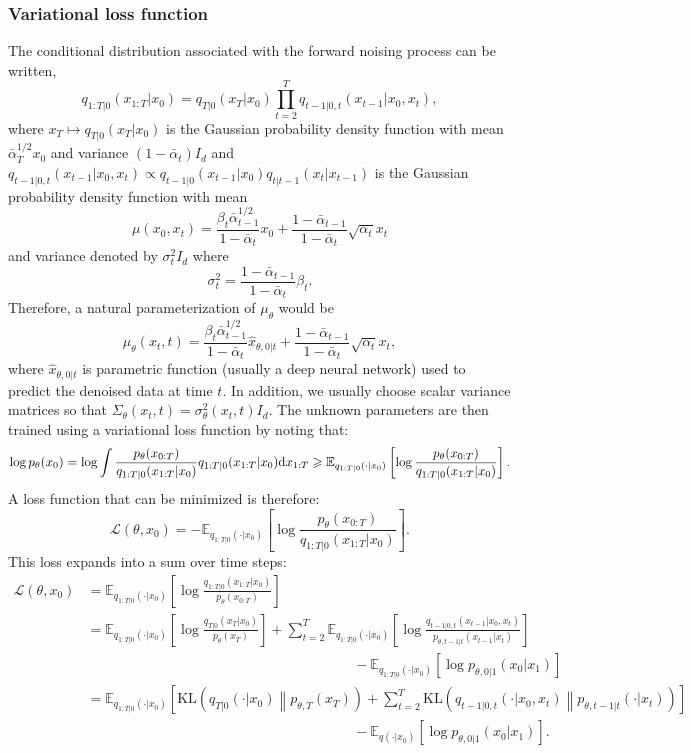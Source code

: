 \documentclass[english,graybox,envcountchap,envcountsame,sectrefs,shortlabels]{svmono}
\theoremstyle{style}
\newcommand{\eqsp}{}
\begin{document}
\subsubsection*{Variational loss function}
The conditional distribution associated with the forward noising process can be written, 
$$
q_{1:T|0}(x_{1:T}|x_0) = q_{T|0}(x_T|x_0)\prod_{t=2}^Tq_{t-1|0,t}(x_{t-1}|x_0,x_t)\eqsp,
$$
where $x_T\mapsto q_{T|0}(x_T|x_0)$ is the Gaussian probability density function with mean $\bar {\alpha}_T^{1/2}x_0$ and variance $(1-\bar \alpha_t)I_d$ and 
$q_{t-1|0,t}(x_{t-1}|x_0,x_t) \propto q_{t-1|0}(x_{t-1}|x_0) q_{t|t-1}(x_{t}|x_{t-1})$ is the Gaussian probability density function with mean
$$
\mu(x_0,x_t) = \frac{\beta_t\bar{\alpha}_{t-1}^{1/2}}{1-\bar{\alpha}_t}x_0 + \frac{1 - \bar{\alpha}_{t-1}}{1 - \bar{\alpha}_t}\sqrt{\alpha_t}x_t
$$ 
and variance denoted by $\sigma^2_{t}I_d$ where
$$ 
\sigma^2_{t} = \frac{1-\bar{\alpha}_{t-1}}{1-\bar{\alpha}_t} \beta_t\eqsp.
$$
Therefore, a natural parameterization of $\mu_\theta$ would be
$$
\mu_\theta(x_{t}, t) = \frac{\beta_t\bar{\alpha}_{t-1}^{1/2}}{1-\bar{\alpha}_t}\widehat{x}_{\theta,0|t} + \frac{1 - \bar{\alpha}_{t-1}}{1 - \bar{\alpha}_t}\sqrt{\alpha_t}x_t\eqsp,
$$
where $\widehat{x}_{\theta,0|t}$ is parametric function (usually a deep neural network) used to predict the denoised data at time $t$. In addition, we usually choose scalar variance matrices so that $\Sigma_\theta(x_{t}, t) = \sigma^2_{\theta}(x_t,t)I_d$.  
The unknown parameters are then trained using a variational loss function by noting that:
$$
\log p_\theta(x_0) = \log \int \frac{p_\theta(x_{0:T})}{q_{1:T|0}(x_{1:T}|x_0)} q_{1:T|0}(x_{1:T}|x_0)\rmd x_{1:T} \geqslant \mathbb{E}_{q_{1:T|0}(\cdot|x_0)}\left[\log\frac{p_\theta(x_{0:T})}{q_{1:T|0}(x_{1:T}|x_0)}\right]\eqsp.
$$
A loss function that can be minimized is therefore:
$$
\mathcal{L}(\theta,x_0) = -\mathbb{E}_{q_{1:T|0}(\cdot|x_0)}\left[\log\frac{p_\theta(x_{0:T})}{q_{1:T|0}(x_{1:T}|x_0)}\right]\eqsp.
$$
This loss expands into a sum over time steps:
\begin{align*}
\mathcal{L}(\theta,x_0) &= \mathbb{E}_{q_{1:T|0}(\cdot|x_0)}\left[\log\frac{q_{1:T|0}(x_{1:T}|x_0)}{p_\theta(x_{0:T})}\right] \\
&= \mathbb{E}_{q_{1:T|0}(\cdot|x_0)}\left[\log\frac{q_{T|0}(x_{T}|x_0)}{p_\theta(x_{T})}\right] + \sum_{t=2}^T\mathbb{E}_{q_{1:T|0}(\cdot|x_0)}\left[\log\frac{q_{t-1|0,t}(x_{t-1}|x_0,x_t)}{p_{\theta,t-1|t}(x_{t-1}|x_t)}\right] \\
&\hspace{8cm} - \mathbb{E}_{q_{1:T|0}(\cdot|x_0)}\left[\log p_{\theta,0|1}(x_{0}|x_1)\right]\\
&= \mathbb{E}_{q_{1:T|0}(\cdot|x_0)}\left[\mathrm{KL}\left(q_{T|0}(\cdot|x_0)\middle\|p_{\theta,T}(x_{T})\right) + \sum_{t=2}^T\mathrm{KL}\left(q_{t-1|0,t}(\cdot|x_0,x_t)\middle\|p_{\theta,t-1|t}(\cdot|x_t)\right)\right] \\
&\hspace{8cm} -\mathbb{E}_{q(\cdot|x_0)}\left[\log p_{\theta,0|1}(x_{0}|x_1)\right] \eqsp.
\end{align*}
\end{document}
